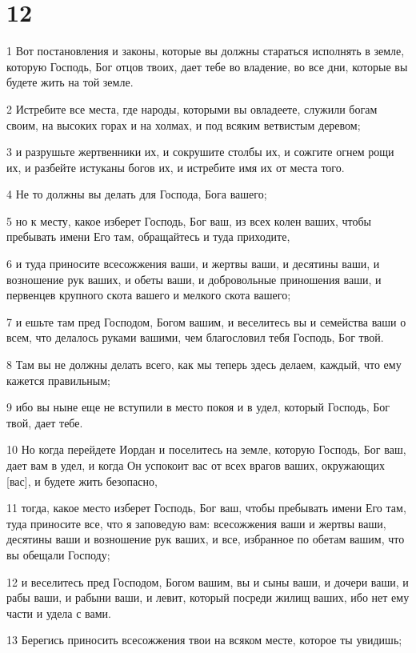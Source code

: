 \chapter{12}

\par 1 Вот постановления и законы, которые вы должны стараться исполнять в земле, которую Господь, Бог отцов твоих, дает тебе во владение, во все дни, которые вы будете жить на той земле.
\par 2 Истребите все места, где народы, которыми вы овладеете, служили богам своим, на высоких горах и на холмах, и под всяким ветвистым деревом;
\par 3 и разрушьте жертвенники их, и сокрушите столбы их, и сожгите огнем рощи их, и разбейте истуканы богов их, и истребите имя их от места того.
\par 4 Не то должны вы делать для Господа, Бога вашего;
\par 5 но к месту, какое изберет Господь, Бог ваш, из всех колен ваших, чтобы пребывать имени Его там, обращайтесь и туда приходите,
\par 6 и туда приносите всесожжения ваши, и жертвы ваши, и десятины ваши, и возношение рук ваших, и обеты ваши, и добровольные приношения ваши, и первенцев крупного скота вашего и мелкого скота вашего;
\par 7 и ешьте там пред Господом, Богом вашим, и веселитесь вы и семейства ваши о всем, что делалось руками вашими, чем благословил тебя Господь, Бог твой.
\par 8 Там вы не должны делать всего, как мы теперь здесь делаем, каждый, что ему кажется правильным;
\par 9 ибо вы ныне еще не вступили в место покоя и в удел, который Господь, Бог твой, дает тебе.
\par 10 Но когда перейдете Иордан и поселитесь на земле, которую Господь, Бог ваш, дает вам в удел, и когда Он успокоит вас от всех врагов ваших, окружающих [вас], и будете жить безопасно,
\par 11 тогда, какое место изберет Господь, Бог ваш, чтобы пребывать имени Его там, туда приносите все, что я заповедую вам: всесожжения ваши и жертвы ваши, десятины ваши и возношение рук ваших, и все, избранное по обетам вашим, что вы обещали Господу;
\par 12 и веселитесь пред Господом, Богом вашим, вы и сыны ваши, и дочери ваши, и рабы ваши, и рабыни ваши, и левит, который посреди жилищ ваших, ибо нет ему части и удела с вами.
\par 13 Берегись приносить всесожжения твои на всяком месте, которое ты увидишь;
